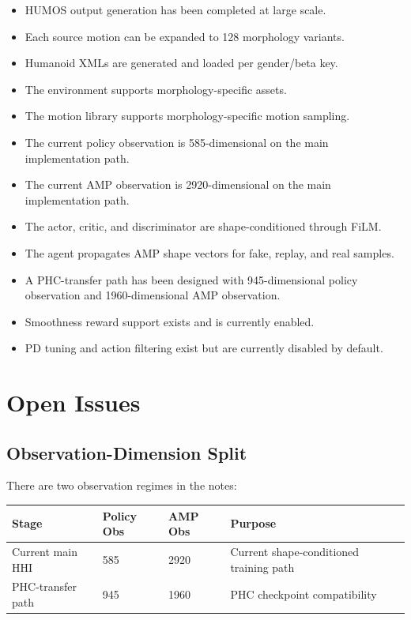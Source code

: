 \documentclass[11pt,a4paper]{article}
\begin{document}
\begin{itemize}[leftmargin=2em]
    \item HUMOS output generation has been completed at large scale.
    \item Each source motion can be expanded to 128 morphology variants.
    \item Humanoid XMLs are generated and loaded per gender/beta key.
    \item The environment supports morphology-specific assets.
    \item The motion library supports morphology-specific motion sampling.
    \item The current policy observation is 585-dimensional on the main implementation path.
    \item The current AMP observation is 2920-dimensional on the main implementation path.
    \item The actor, critic, and discriminator are shape-conditioned through FiLM.
    \item The agent propagates AMP shape vectors for fake, replay, and real samples.
    \item A PHC-transfer path has been designed with 945-dimensional policy observation and 1960-dimensional AMP observation.
    \item Smoothness reward support exists and is currently enabled.
    \item PD tuning and action filtering exist but are currently disabled by default.
\end{itemize}

\section{Open Issues}

\subsection{Observation-Dimension Split}

There are two observation regimes in the notes:

\begin{center}
    \begin{tabular}{llll}
        \toprule
        Stage             & Policy Obs & AMP Obs & Purpose                                 \\
        \midrule
        Current main HHI  & 585        & 2920    & Current shape-conditioned training path \\
        PHC-transfer path & 945        & 1960    & PHC checkpoint compatibility            \\
        \bottomrule
    \end{tabular}
\end{center}
\end{document}
